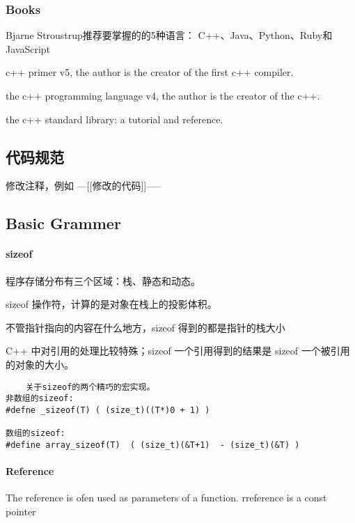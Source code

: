 \documentclass[UTF8]{../computerUniverse}
\begin{document}
\subsubsection{Books}


Bjarne Stroustrup推荐要掌握的的5种语言：
C++、Java、Python、Ruby和JavaScript


c++ primer v5, the author is the creator of the first c++ compiler.

the c++ programming language v4, the author is the creator of the c++.

the c++ standard library: a tutorial and reference.



\subsection{代码规范}

修改注释，例如
---[[修改的代码]]-----



\subsection{Basic Grammer}

\paragraph{sizeof}

程序存储分布有三个区域：栈、静态和动态。

sizeof 操作符，计算的是对象在栈上的投影体积。

不管指针指向的内容在什么地方，sizeof 得到的都是指针的栈大小

C++ 中对引用的处理比较特殊；sizeof 一个引用得到的结果是 sizeof 一个被引用的对象的大小。



\begin{lstlisting}
    关于sizeof的两个精巧的宏实现。
非数组的sizeof:
#defne _sizeof(T) ( (size_t)((T*)0 + 1) )

数组的sizeof:
#define array_sizeof(T)  ( (size_t)(&T+1)  - (size_t)(&T) )
\end{lstlisting}


\paragraph{Reference}
The reference is ofen used as parameters of a function. 
rreference is a const pointer
\end{document}
